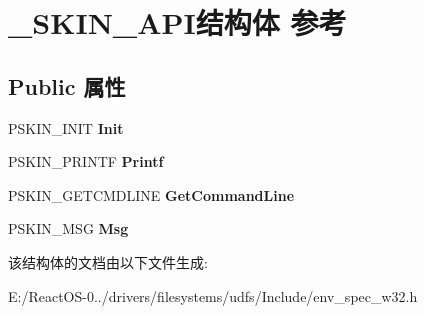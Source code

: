 \hypertarget{struct___s_k_i_n___a_p_i}{}\section{\+\_\+\+S\+K\+I\+N\+\_\+\+A\+P\+I结构体 参考}
\label{struct___s_k_i_n___a_p_i}
\subsection*{Public 属性}
\begin{DoxyCompactItemize}
\item 
\mbox{\label{struct___s_k_i_n___a_p_i_ae878df46c792bee3bd3fbaef44977d05}} 
P\+S\+K\+I\+N\+\_\+\+I\+N\+IT {\bfseries Init}
\item 
\mbox{\label{struct___s_k_i_n___a_p_i_adc7b8929e80d7df18bac1dcd52b67b98}} 
P\+S\+K\+I\+N\+\_\+\+P\+R\+I\+N\+TF {\bfseries Printf}
\item 
\mbox{\label{struct___s_k_i_n___a_p_i_a04934539c0775ea5bd3a43bb185c2189}} 
P\+S\+K\+I\+N\+\_\+\+G\+E\+T\+C\+M\+D\+L\+I\+NE {\bfseries Get\+Command\+Line}
\item 
\mbox{\label{struct___s_k_i_n___a_p_i_a5c075af50f29d21c7645714a1698a83d}} 
P\+S\+K\+I\+N\+\_\+\+M\+SG {\bfseries Msg}
\end{DoxyCompactItemize}


该结构体的文档由以下文件生成\+:\begin{DoxyCompactItemize}
\item 
E\+:/\+React\+O\+S-\/0../drivers/filesystems/udfs/\+Include/env\+\_\+spec\+\_\+w32.\+h\end{DoxyCompactItemize}
